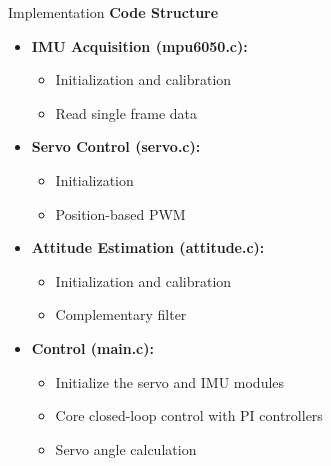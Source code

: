 \documentclass[10pt]{beamer}
\begin{document}
\begin{frame}{Implementation}
  \textbf{Code Structure}

  \begin{itemize}
    \item \textbf{IMU Acquisition (mpu6050.c):} 
    \begin{itemize}
      \item Initialization and calibration
      \item Read single frame data
    \end{itemize}
    \item \textbf{Servo Control (servo.c):}
    \begin{itemize}
      \item Initialization
      \item Position-based PWM
    \end{itemize}
    \item \textbf{Attitude Estimation (attitude.c):}
    \begin{itemize}
      \item Initialization and calibration
      \item Complementary filter
    \end{itemize}
    \item \textbf{Control (main.c):}
    \begin{itemize}
      \item Initialize the servo and IMU modules
      \item Core closed-loop control with PI controllers
      \item Servo angle calculation
    \end{itemize}
  \end{itemize}
\end{frame}
\end{document}
